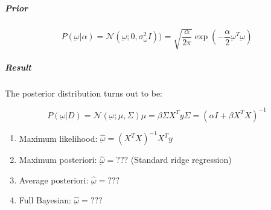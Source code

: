 \subparagraph{Prior}

\[P(\underbar{\omega} | \alpha) = \mathcal{N}(\underbar{\omega} ; 0 , \sigma_{\omega}^2 I)) =
	\sqrt{\frac{\alpha}{2\pi}} \exp \left( -\frac{\alpha}{2} \underbar{\omega}^T \underbar{\omega} \right)
\]

\subparagraph{Result}

The posterior distribution turns out to be:

\[P(\underbar{\omega} | D) = \mathcal{N}(\underbar{\omega} ; \mu, \Sigma)
	\mu = \beta \Sigma X^T y
	\Sigma = \left( \alpha I + \beta X^T X \right)^{-1}
\]

\begin{enumerate}
	\item
	      Maximum likelihood: \(\hat{\underbar{\omega}} = (X^T X)^{-1} X^T y\)
	\item
	      Maximum posteriori: \(\hat{\underbar{\omega}} = ???\) (Standard ridge
	      regression)
	\item
	      Average posteriori: \(\hat{\underbar{\omega}} = ???\)
	\item
	      Full Bayesian: \(\hat{\underbar{\omega}} = ???\)
\end{enumerate}
